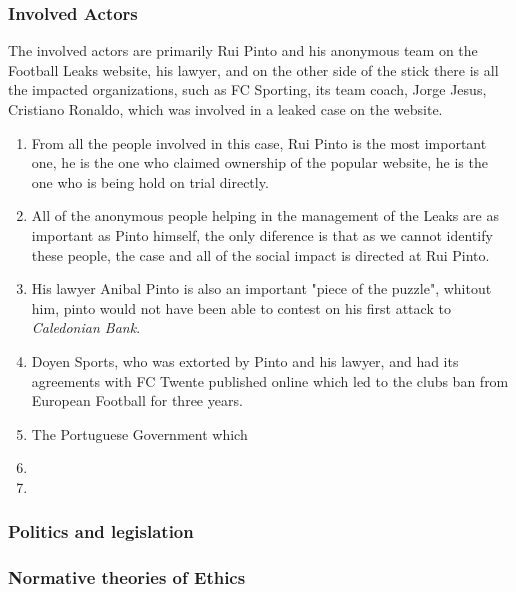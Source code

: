 \subsubsection{Involved Actors}
The involved actors are primarily Rui Pinto and his anonymous team on the Football Leaks website, his lawyer, and on the other side of the stick there is all the impacted organizations, such as FC Sporting, its team coach, Jorge Jesus, Cristiano Ronaldo, which was involved in a leaked case on the website.
\begin{enumerate}
    \item From all the people involved in this case, Rui Pinto is the most important one, he is the one who claimed ownership of the popular website, he is the one who is being hold on trial directly.
    \item All of the anonymous people helping in the management of the Leaks are as important as Pinto himself, the only diference is that as we cannot identify these people, the case and all of the social impact is directed at Rui Pinto.
    \item His lawyer Anibal Pinto is also an important "piece of the puzzle", whitout him, pinto would not have been able to contest on his first attack to \textit{Caledonian Bank}.
    \item Doyen Sports, who was extorted by Pinto and his lawyer, and had its agreements with FC Twente published online which led to the clubs ban from European Football for three years.
    \item The Portuguese Government which 
    \item 
    \item 
\end{enumerate}



\subsubsection{Politics and legislation}
\subsubsection{Normative theories of Ethics}


    